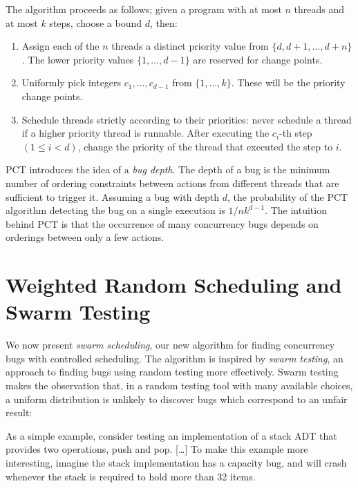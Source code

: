 The algorithm proceeds as follows; given a program with at most $n$
threads and at most $k$ steps, choose a bound $d$, then:

\begin{enumerate}
\item Assign each of the $n$ threads a distinct priority value from
  $\{d, d + 1, \ldots, d+n\}$.  The lower priority values
  $\{1, \ldots, d−1\}$ are reserved for change points.
\item Uniformly pick integers $c_1, \ldots, c_{d−1}$ from $\{1, \ldots, k\}$.
  These will be the priority change points.
\item Schedule threads strictly according to their priorities: never schedule a
  thread if a higher priority thread is runnable.  After executing the $c_i$-th
  step $(1 \leq i < d)$, change the priority of the thread that executed the
  step to $i$.
\end{enumerate}

PCT introduces the idea of a \emph{bug depth}.  The depth of a bug is
the minimum number of ordering constraints between actions from
different threads that are sufficient to trigger
it\cite{burckhardt2010}.  Assuming a bug with depth $d$, the
probability of the PCT algorithm detecting the bug on a single
execution is $1/nk^{d−1}$.  The intuition behind PCT is that the
occurrence of many concurrency bugs depends on orderings between only
a few actions.

\section{Weighted Random Scheduling and Swarm Testing}
\label{sec:algorithms-swarm}

We now present \emph{swarm scheduling}, our new algorithm for finding
concurrency bugs with controlled scheduling.  The algorithm is
inspired by \emph{swarm testing}\cite{groce2012}, an approach to
finding bugs using random testing more effectively.  Swarm testing
makes the observation that, in a random testing tool with many
available choices, a uniform distribution is unlikely to discover bugs
which correspond to an unfair result:

\begin{displayquote}
  As a simple example, consider testing an implementation of a stack ADT that
  provides two operations, push and pop. [\ldots] To make this example more
  interesting, imagine the stack implementation has a capacity bug, and will
  crash whenever the stack is required to hold more than 32
  items.\cite{groce2012}
\end{displayquote}

